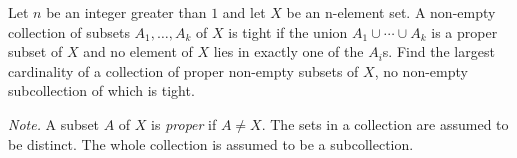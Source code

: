 Let $n$ be an integer greater than $1$ and let $X$ be an n-element set. A non-empty collection of subsets $A_1,\ldots, A_k$ of $X$ is tight if the union $A_1 \cup \cdots  \cup A_k$ is a proper subset of $X$ and no element of $X$ lies in exactly one of the $A_i$s. Find the largest cardinality of a collection of proper non-empty subsets of $X$, no non-empty subcollection of which is tight.

\emph{Note.} A subset $A$ of $X$ is \emph{proper} if $A\neq X$. The sets in a collection are assumed to be distinct. The whole collection is assumed to be a subcollection.